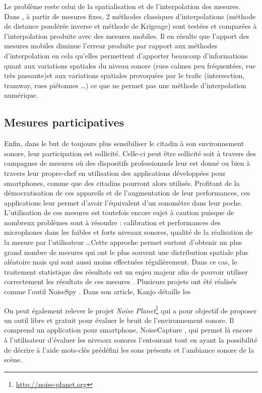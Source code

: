 Le problème reste celui de la spatialisation et de l'interpolation des mesures. Dans \cite{can_measurement_2014}, à partir de mesures fixes, 2 méthodes classiques d'interpolations (méthode de distance pondérée inverse et méthode de Krigeage) sont testées et comparées à l'interpolation produite avec des mesures mobiles. Il en résulte que l'apport des mesures mobiles diminue l'erreur produite par rapport aux méthodes d'interpolation en cela qu'elles permettent d'apporter beaucoup d'informations quant aux variations spatiales du niveau sonore (rues calmes peu fréquentées, rue très passante)et aux variations spatiales provoquées par le trafic (intersection, tramway, rues piétonnes \dots) ce que ne permet pas une méthode d'interpolation numérique.

\subsection{Mesures participatives}
Enfin, dans le but de toujours plus sensibiliser le citadin à son environnement sonore, leur participation est sollicité. Celle-ci peut être sollicité soit à travers des campagnes de mesures où des dispositifs professionnels leur est donné \cite{} ou bien à travers leur propre-chef en utilisation des applications développées pour smartphones, comme  que des citadins pourront alors utilisés. Profitant de la démocratisation de ces appareils et de l'augmentation de leur performances, ces applications leur permet d'avoir l'équivalent d'un sonomètre dans leur poche. L'utilisation de ces mesures est toutefois encore sujet à caution puisque de nombreux problèmes sont à résoudre : calibration et performances des microphones dans les faibles et forts niveaux sonores, qualité de la réalisation de la mesure par l'utilisateur \dots Cette approche permet surtout d'obtenir un plus grand nombre de mesures qui ont le plus souvent une distribution spatiale plus aléatoire mais qui sont aussi moins effectuées régulièrement. Dans ce cas, le traitement statistique des résultats est un enjeu majeur afin de pouvoir utiliser correctement les résultats de ces mesures \cite{guillaume2016noise}. Plusieurs projets ont été réalisés comme l'outil  NoiseSpy \cite{kanjo_noisespy_2010}. Dans son article, Kanjo détaille les


On peut également relever le projet \textit{Noise Planet}\footnote{\url{http://noise-planet.org}} qui a pour objectif de proposer un outil libre et gratuit pour évaluer le bruit de l'environnement sonore. Il comprend un application pour smartphone, NoiseCapture \cite{guillaume2016noise}, qui permet là encore à l'utilisateur d'évaluer les niveaux sonores l'entourant tout en ayant la possibilité de décrire à l'aide mots-clés prédéfini les sons présents et l'ambiance sonore de la scène. 


